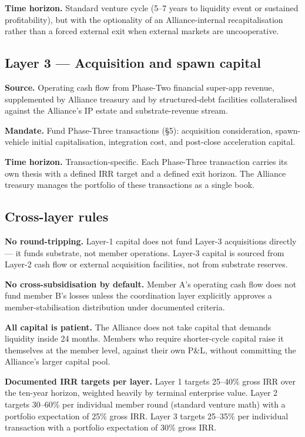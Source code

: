\textbf{Time horizon.} Standard venture cycle (5--7 years to liquidity
event or sustained profitability), but with the optionality of an
Alliance-internal recapitalisation rather than a forced external exit
when external markets are uncooperative.

\subsection{Layer 3 --- Acquisition and spawn capital}

\textbf{Source.} Operating cash flow from Phase-Two financial super-app
revenue, supplemented by Alliance treasury and by structured-debt
facilities collateralised against the Alliance's IP estate and
substrate-revenue stream.

\textbf{Mandate.} Fund Phase-Three transactions (\S 5): acquisition
consideration, spawn-vehicle initial capitalisation, integration cost,
and post-close acceleration capital.

\textbf{Time horizon.} Transaction-specific. Each Phase-Three transaction
carries its own thesis with a defined IRR target and a defined exit
horizon. The Alliance treasury manages the portfolio of these
transactions as a single book.

\subsection{Cross-layer rules}

\textbf{No round-tripping.} Layer-1 capital does not fund Layer-3
acquisitions directly --- it funds substrate, not member operations. Layer-3
capital is sourced from Layer-2 cash flow or external acquisition
facilities, not from substrate reserves.

\textbf{No cross-subsidisation by default.} Member A's operating cash
flow does not fund member B's losses unless the coordination layer
explicitly approves a member-stabilisation distribution under documented
criteria.

\textbf{All capital is patient.} The Alliance does not take capital that
demands liquidity inside 24 months. Members who require shorter-cycle
capital raise it themselves at the member level, against their own P\&L,
without committing the Alliance's larger capital pool.

\textbf{Documented IRR targets per layer.} Layer 1 targets 25--40\%
gross IRR over the ten-year horizon, weighted heavily by terminal
enterprise value. Layer 2 targets 30--60\% per individual member round
(standard venture math) with a portfolio expectation of 25\% gross IRR.
Layer 3 targets 25--35\% per individual transaction with a portfolio
expectation of 30\% gross IRR.

